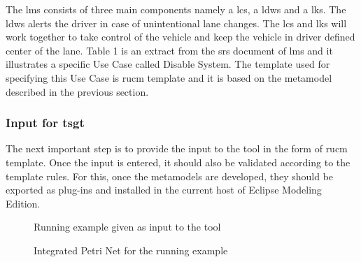 The \gls{lms} consists of three main components namely a \gls{lcs}, a \gls{ldws} and a \gls{lks}. The \gls{ldws} alerts the driver in case of unintentional lane changes. The \gls{lcs} and \gls{lks} will work together to take control of the vehicle and keep the vehicle in driver defined center of the lane. Table 1 is an extract from the \gls{srs} document of \gls{lms} and it illustrates a specific Use Case called Disable System. The template used for specifying this Use Case is \gls{rucm} template and it is based on the metamodel described in the previous section.

\subsubsection{Input for \gls{tsgt}}
The next important step is to provide the input to the tool in the form of \gls{rucm} template. Once the input is entered, it should also be validated according to the template rules. For this, once the metamodels are developed, they should be exported as plug-ins and installed in the current host of Eclipse Modeling Edition.

\begin{figure}[htb!]
\centering
{}
\caption{Running example given as input to the tool}
\label{fig:input}
\end{figure}

\begin{figure}[htb!]
\centering
{}
\caption{Integrated Petri Net for the running example}
\label{fig:integratedpn}
\end{figure}


